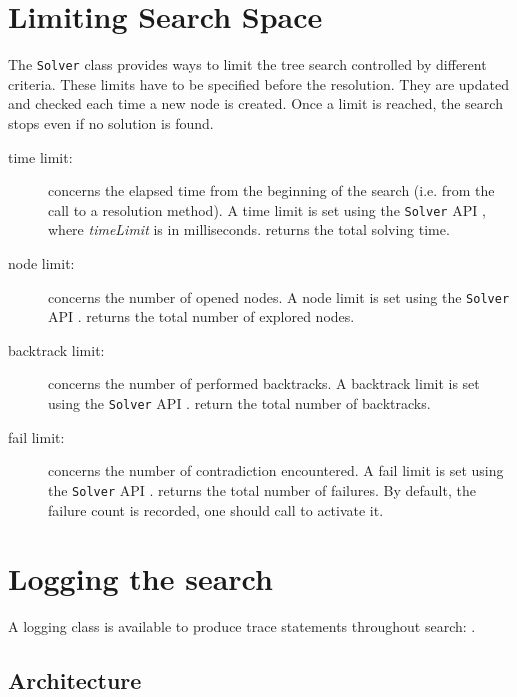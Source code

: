 \section{Limiting Search Space}\label{solver:limitingsearchspace}\hypertarget{solver:limitingsearchspace}{}
The \texttt{Solver} class provides ways to limit the tree search controlled by different criteria.
These limits have to be specified before the resolution. They are updated and checked each time a new node is created. 
 Once a limit is reached, the search stops even if no solution is found.
\begin{description}
\item[time limit:] concerns the elapsed time from the beginning of the search (i.e. from the call to a resolution method).
A time limit is set using the \texttt{Solver} API , where \textit{timeLimit} is in milliseconds. 
 returns the total solving time. 
\item[node limit:] concerns the number of opened nodes.
A node limit is set using the \texttt{Solver} API .
 returns the total number of explored nodes.
\item[backtrack limit:] concerns the number of performed backtracks. 
A backtrack limit is set using the \texttt{Solver} API .
 return the total number of backtracks.
\item[fail limit:] concerns the number of contradiction encountered.
A fail limit is set using the \texttt{Solver} API .
 returns the total number of failures.
By default, the failure count is recorded, one should call  to activate it.
\end{description}

\section{Logging the search}\label{solver:logs}\hypertarget{solver:logs}{}
A logging class is available to produce trace statements throughout search: . 

\subsection{Architecture }\label{solver:logarchitecture}\hypertarget{solver:logarchitecture}{}

